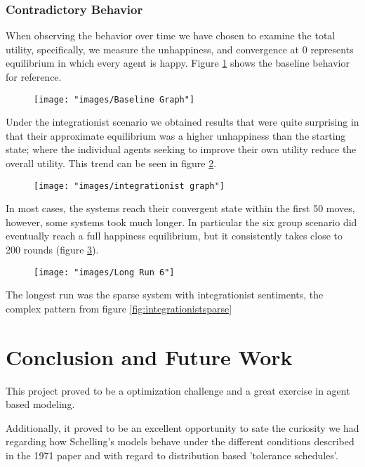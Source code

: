 \documentclass[sigplan,nonacm]{acmart}
\begin{document}
\subsubsection{Contradictory Behavior}

When observing the behavior over time we have chosen to examine the total utility, specifically,
we measure the unhappiness, and convergence at 0 represents equilibrium in which every agent is happy.
Figure \ref{fig:baseline-graph} shows the baseline behavior for reference.

\begin{figure}
	\centering
	\texttt{[image: "images/Baseline Graph"]}
	\caption{}
	\label{fig:baseline-graph}
\end{figure}


Under the integrationist scenario we obtained results that were quite surprising in that their approximate
equilibrium was a higher unhappiness than the starting state;
where the individual agents seeking to improve their own utility reduce the overall utility.
This trend can be seen in figure \ref{fig:integrationist-graph}.

\begin{figure}
	\centering
	\texttt{[image: "images/integrationist graph"]}
	\caption{}
	\label{fig:integrationist-graph}
\end{figure}

In most cases, the systems reach their convergent state within the first 50 moves, however, some systems took much longer.
In particular the six group scenario did eventually reach a full happiness equilibrium, but it consistently takes
close to 200 rounds (figure \ref{fig:long-run-6}).

\begin{figure}
	\centering
	\texttt{[image: "images/Long Run 6"]}
	\caption{}
	\label{fig:long-run-6}
\end{figure}

The longest run was the sparse system with integrationist sentiments, the complex pattern from figure \ref{fig:integrationistsparse} 


\section{Conclusion and Future Work}

This project proved to be a optimization challenge and a great exercise in agent based modeling.

Additionally, it proved to be an excellent opportunity to sate the curiosity we had regarding how Schelling's models behave
under the different conditions described in the 1971 paper and with regard to distribution based 'tolerance schedules'.
\end{document}
